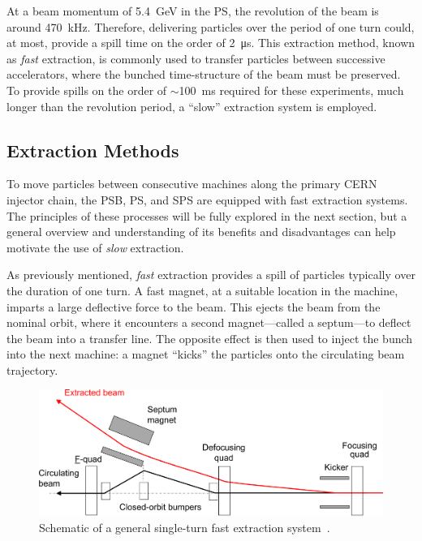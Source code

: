 \documentclass[11pt]{report}
\begin{document}
At a beam momentum of \qty{5.4}{\giga\electronvolt} in the PS, the revolution of the beam is around \qty{470}{kHz}. Therefore, delivering particles over the period of one turn could, at most, provide a spill time on the order of \qty{2}{\micro\second}. This extraction method, known as \textit{fast} extraction, is commonly used to transfer particles between successive accelerators, where the bunched time-structure of the beam must be preserved. To provide spills on the order of $\sim$\qty{100}{\ms} required for these experiments, much longer than the revolution period, a ``slow'' extraction system is employed.

\subsection{Extraction Methods}

To move particles between consecutive machines along the primary CERN injector chain, the PSB, PS, and SPS are equipped with fast extraction systems. The principles of these processes will be fully explored in the next section, but a general overview and understanding of its benefits and disadvantages can help motivate the use of \textit{slow} extraction. 

As previously mentioned, \textit{fast} extraction provides a spill of particles typically over the duration of one turn. A fast magnet, at a suitable location in the machine, imparts a large deflective force to the beam. This ejects the beam from the nominal orbit, where it encounters a second magnet---called a septum---to deflect the beam into a transfer line. The opposite effect is then used to inject the bunch into the next machine: a magnet ``kicks'' the particles onto the circulating beam trajectory.

\begin{figure}[h]
  \centering
  \includegraphics[width=\linewidth]{fast.png}
  \caption{Schematic of a general single-turn fast extraction system~\cite{Fraser:CAS}.}\label{fig:fast_diagram}
\end{figure}
\end{document}
